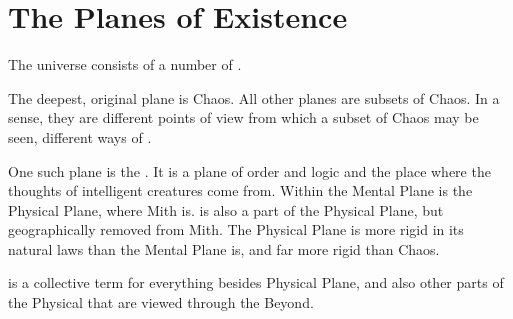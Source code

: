 






\section{The Planes of Existence}
The universe consists of a number of . 


The deepest, original plane is Chaos. All other planes are subsets of Chaos. In a sense, they are different points of view from which a subset of Chaos may be seen, different ways of . 

One such plane is the . It is a plane of order and logic and the place where the thoughts of intelligent creatures come from. Within the Mental Plane is the Physical Plane, where Mith is. \Erebos{} is also a part of the Physical Plane, but geographically removed from Mith. The Physical Plane is more rigid in its natural laws than the Mental Plane is, and far more rigid than Chaos. 

 is a collective term for everything besides Physical Plane, and also other parts of the Physical that are viewed through the Beyond. 


